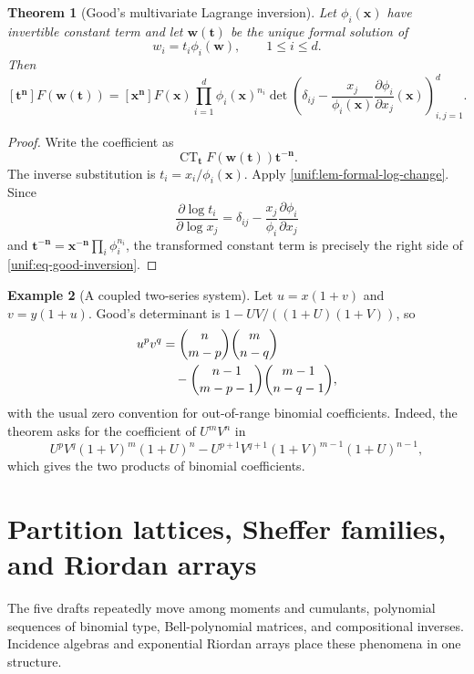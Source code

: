 \documentclass[11pt,a4paper,oneside,openany]{book}
\newtheorem{theorem}{Theorem}[chapter]
\theoremstyle{definition}
\newtheorem{example}[theorem]{Example}
\theoremstyle{remark}
\begin{document}
\begin{theorem}[Good's multivariate Lagrange inversion]
\label{unif:thm-good-inversion}
Let $\phi_i(\bm x)$ have invertible constant term and let $\bm w(\bm t)$ be
the unique formal solution of
\begin{equation}\label{unif:eq-good-system}
 w_i=t_i\phi_i(\bm w),\qquad1\le i\le d.
\end{equation}
Then
\begin{equation}\label{unif:eq-good-inversion}
 [\bm t^{\bm n}]F(\bm w(\bm t))
 =[\bm x^{\bm n}]F(\bm x)\prod_{i=1}^{d}\phi_i(\bm x)^{n_i}
 \det\!\left(
 \delta_{ij}-\frac{x_j}{\phi_i(\bm x)}
 \frac{\partial\phi_i}{\partial x_j}(\bm x)
 \right)_{i,j=1}^{d}.
\end{equation}
\end{theorem}
\begin{proof}
Write the coefficient as
\[
 \operatorname{CT}_{\bm t}F(\bm w(\bm t))\bm t^{-\bm n}.
\]
The inverse substitution is $t_i=x_i/\phi_i(\bm x)$. Apply
\cref{unif:lem-formal-log-change}. Since
\[
 \frac{\partial\log t_i}{\partial\log x_j}
 =\delta_{ij}-\frac{x_j}{\phi_i}\frac{\partial\phi_i}{\partial x_j}
\]
and $\bm t^{-\bm n}=\bm x^{-\bm n}\prod_i\phi_i^{n_i}$, the transformed
constant term is precisely the right side of
\eqref{unif:eq-good-inversion}.
\end{proof}

\begin{example}[A coupled two-series system]
Let $u=x(1+v)$ and $v=y(1+u)$. Good's determinant is
$1-UV/((1+U)(1+V))$, so
\begin{align}
 [x^my^n]u^pv^q
 &=\binom{n}{m-p}\binom{m}{n-q}
 \notag\\
 &\quad-\binom{n-1}{m-p-1}\binom{m-1}{n-q-1},
 \label{unif:eq-coupled-coefficients}
\end{align}
with the usual zero convention for out-of-range binomial coefficients.
Indeed, the theorem asks for the coefficient of $U^mV^n$ in
\[
 U^pV^q(1+V)^m(1+U)^n
 -U^{p+1}V^{q+1}(1+V)^{m-1}(1+U)^{n-1},
\]
which gives the two products of binomial coefficients.
\end{example}

\chapter{Partition lattices, Sheffer families, and Riordan arrays}

The five drafts repeatedly move among moments and cumulants, polynomial
sequences of binomial type, Bell-polynomial matrices, and compositional
inverses. Incidence algebras and exponential Riordan arrays place these
phenomena in one structure.
\end{document}
